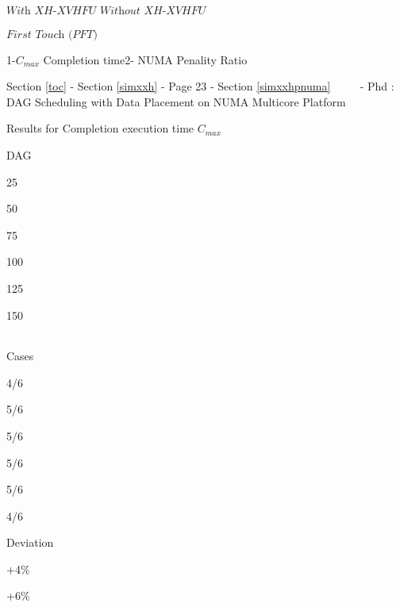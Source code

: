 \documentclass[11pt]{article}
\begin{document}
\textbar{}

\(\textit{With XH-XVHFU}\) \(\textit{Without XH-XVHFU}\)

\textbar{}

\(\textit{First Touch (PFT)}\)

\textbar{}

1-\(C_{max}\) Completion time2- NUMA Penality Ratio

\textbar{}

     {Section \ref{toc} - Section \ref{simxxh} - Page 23 -
Section \ref{simxxhpnuma} ~~~~ - Phd : DAG Scheduling with Data
Placement on NUMA Multicore Platform}

Results for Completion execution time \(C_{max}\)

\textbar{}

DAG

\textbar{}

25

\textbar{}

50

\textbar{}

75

\textbar{}

100

\textbar{}

125

\textbar{}

150

\begin{longtable}[]{@{}lllllll@{}}
\toprule
\bottomrule
\end{longtable}

\textbar{}

Cases

\textbar{}

4/6

\textbar{}

5/6

\textbar{}

5/6

\textbar{}

5/6

\textbar{}

5/6

\textbar{}

4/6

\textbar{} \textbar{}

Deviation

\textbar{}

+4\%

\textbar{}

+6\%
\end{document}
